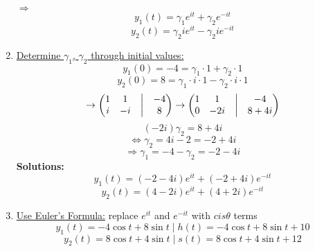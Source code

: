 \documentclass{article}
\begin{document}
\begin{enumerate}
    $\Rightarrow$
    \begin{equation*} y_1(t) = \gamma_1 e^{i t} + \gamma_2 e^{-i t} \end{equation*}
    \begin{equation*} y_2(t) = \gamma_2 i e^{i t} - \gamma_2 i e^{-i t} \end{equation*} 
    \item \underline{Determine $\gamma_1$, $\gamma_2$ through initial values:}
    \begin{equation*} y_1(0) = -4 = \gamma_1 \cdot 1 + \gamma_2 \cdot 1 \end{equation*}
    \begin{equation*} y_2(0) = 8 = \gamma_1 \cdot i \cdot 1 - \gamma_2 \cdot i \cdot 1 \end{equation*}
    \begin{equation*} \rightarrow \begin{pmatrix} 1 & 1 &\bigm| & -4 \\  i & -i &\bigm| & 8  \end{pmatrix} \rightarrow \begin{pmatrix} 1 & 1 &\bigm| & -4 \\ 0 & -2i &\bigm| & 8+4i \end{pmatrix} \end{equation*}
    \begin{equation*} (-2i) \gamma_2  = 8 + 4 i \end{equation*}
    \begin{equation*} \Leftrightarrow \gamma_2 = 4i - 2 = -2 + 4i \end{equation*} 
    \begin{equation*} \Rightarrow \gamma_1 = -4 - \gamma_2 = -2 - 4i \end{equation*}
    \textbf{Solutions:}
    \begin{equation*} y_1(t) = (-2 - 4i) e^{i t} + (-2 + 4i) e^{-i t} \end{equation*} 
    \begin{equation*} y_2(t) = (4 - 2i) e^{i t} + (4 + 2i) e^{-i t} \end{equation*}
    \item \underline{Use Euler's Formula:} replace $e^{i t}$ and $e^{-i t}$ with $cis\theta$ terms
    \begin{equation*} y_1(t) = -4\cos t + 8\sin t \mid h(t) = -4\cos t + 8\sin t + 10\end{equation*}
    \begin{equation*} y_2(t) = 8\cos t + 4\sin t \mid s(t) = 8\cos t + 4\sin t + 12 \end{equation*}
\end{enumerate} 
\end{document}

